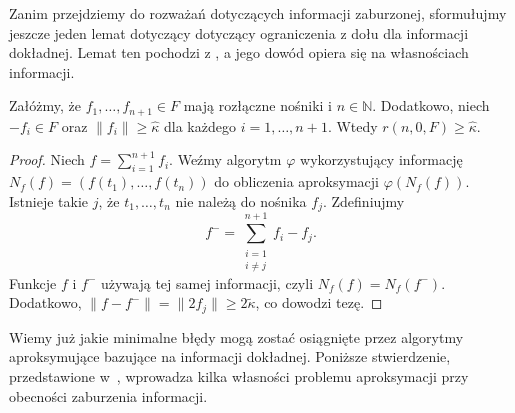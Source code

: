 \documentclass[oik, pdftex, man]{mgrwms}
\begin{document}
    Zanim przejdziemy do rozważań dotyczących informacji zaburzonej, sformułujmy jeszcze jeden lemat dotyczący dotyczący ograniczenia z dołu dla informacji dokładnej. Lemat ten pochodzi z \cite{DaS}, a jego dowód opiera się na własnościach informacji.
    \begin{lemma} \label{lem:3}
        Załóżmy, że $f_{1}, \ldots, f_{n+1} \in F$ mają rozłączne nośniki i $n \in \mathbb{N}$. Dodatkowo, niech $-f_{i} \in F$ oraz $\|f_{i}\| \geq \hat{\kappa}$ dla każdego $i=1, \ldots, n+1$. Wtedy $r(n, 0, F) \geq \hat{\kappa}.$
    \end{lemma}
    \begin{proof}
        Niech $f = \sum_{i=1}^{n+1} f_{i}$. Weźmy algorytm $\varphi$ wykorzystujący informację $N_{f}(f) = (f(t_{1}), \ldots, f(t_{n}))$ do obliczenia aproksymacji $\varphi(N_{f}(f))$. Istnieje takie $j$, że $t_{1}, \ldots, t_{n}$ nie należą do nośnika $f_{j}$. Zdefiniujmy
        \begin{equation*}
            f^{-} = \sum_{\substack{i = 1 \\ i \neq j}}^{n+1} f_{i} - f_{j}.
        \end{equation*}
        Funkcje $f$ i $f^{-}$ używają tej samej informacji, czyli $N_{f}(f) = N_{f}(f^{-})$. \\
        Dodatkowo, $\|f - f^{-}\|  = \|2f_{j}\| \geq 2 \tilde{\kappa}$, co dowodzi tezę.
    \end{proof}

    Wiemy już jakie minimalne błędy mogą zostać osiągnięte przez algorytmy aproksymujące bazujące na informacji dokładnej. Poniższe stwierdzenie, przedstawione w~\cite{AoP}, wprowadza kilka własności problemu aproksymacji przy obecności zaburzenia informacji.
\end{document}
